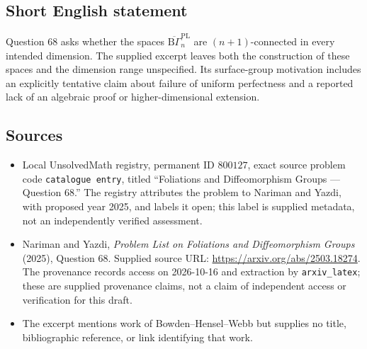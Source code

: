 \documentclass[11pt]{article}
\begin{document}
\subsection{Short English statement}
Question 68 asks whether the spaces \(\overline{\mathrm{B}\Gamma}_n^{\mathrm{PL}}\) are \((n+1)\)-connected in every intended dimension. The supplied excerpt leaves both the construction of these spaces and the dimension range unspecified. Its surface-group motivation includes an explicitly tentative claim about failure of uniform perfectness and a reported lack of an algebraic proof or higher-dimensional extension.
\subsection{Sources}
\begin{itemize}
\item Local UnsolvedMath registry, permanent ID \(800127\), exact source problem code \texttt{catalogue entry}, titled ``Foliations and Diffeomorphism Groups --- Question 68.'' The registry attributes the problem to Nariman and Yazdi, with proposed year 2025, and labels it open; this label is supplied metadata, not an independently verified assessment.
\item Nariman and Yazdi, \emph{Problem List on Foliations and Diffeomorphism Groups} (2025), Question 68. Supplied source URL: \url{https://arxiv.org/abs/2503.18274}. The provenance records access on 2026-10-16 and extraction by \texttt{arxiv\_latex}; these are supplied provenance claims, not a claim of independent access or verification for this draft.
\item The excerpt mentions work of Bowden--Hensel--Webb but supplies no title, bibliographic reference, or link identifying that work.
\end{itemize}
\end{document}
